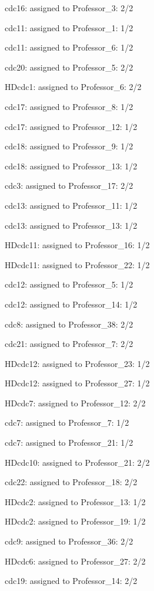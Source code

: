 \documentclass{article} %
\begin{document}
\noindent cdc16: assigned to Professor\_3: 2/2

\noindent cdc11: assigned to Professor\_1: 1/2

\noindent cdc11: assigned to Professor\_6: 1/2

\noindent cdc20: assigned to Professor\_5: 2/2

\noindent HDcdc1: assigned to Professor\_6: 2/2

\noindent cdc17: assigned to Professor\_8: 1/2

\noindent cdc17: assigned to Professor\_12: 1/2

\noindent cdc18: assigned to Professor\_9: 1/2

\noindent cdc18: assigned to Professor\_13: 1/2

\noindent cdc3: assigned to Professor\_17: 2/2

\noindent cdc13: assigned to Professor\_11: 1/2

\noindent cdc13: assigned to Professor\_13: 1/2

\noindent HDcdc11: assigned to Professor\_16: 1/2

\noindent HDcdc11: assigned to Professor\_22: 1/2

\noindent cdc12: assigned to Professor\_5: 1/2

\noindent cdc12: assigned to Professor\_14: 1/2

\noindent cdc8: assigned to Professor\_38: 2/2

\noindent cdc21: assigned to Professor\_7: 2/2

\noindent HDcdc12: assigned to Professor\_23: 1/2

\noindent HDcdc12: assigned to Professor\_27: 1/2

\noindent HDcdc7: assigned to Professor\_12: 2/2

\noindent cdc7: assigned to Professor\_7: 1/2

\noindent cdc7: assigned to Professor\_21: 1/2

\noindent HDcdc10: assigned to Professor\_21: 2/2

\noindent cdc22: assigned to Professor\_18: 2/2

\noindent HDcdc2: assigned to Professor\_13: 1/2

\noindent HDcdc2: assigned to Professor\_19: 1/2

\noindent cdc9: assigned to Professor\_36: 2/2

\noindent HDcdc6: assigned to Professor\_27: 2/2

\noindent cdc19: assigned to Professor\_14: 2/2
\end{document}
